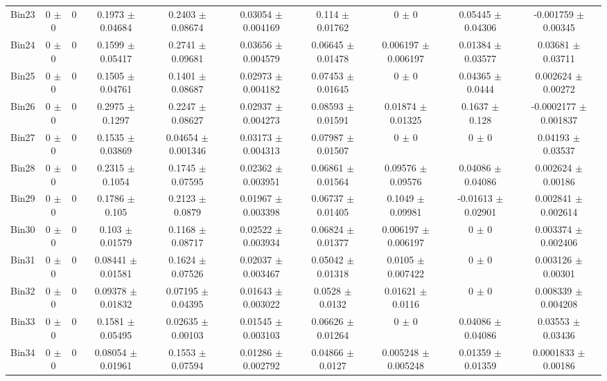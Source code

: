 \begin{tabular}{@{\extracolsep{4pt}}lccccccccc@{}}
     Bin23 & 0 $\pm$ 0 & 0 & 0.1973 $\pm$ 0.04684 & 0.2403 $\pm$ 0.08674 & 0.03054 $\pm$ 0.004169 & 0.114 $\pm$ 0.01762 & 0 $\pm$ 0 & 0.05445 $\pm$ 0.04306 & -0.001759 $\pm$ 0.00345 \\ 
     Bin24 & 0 $\pm$ 0 & 0 & 0.1599 $\pm$ 0.05417 & 0.2741 $\pm$ 0.09681 & 0.03656 $\pm$ 0.004579 & 0.06645 $\pm$ 0.01478 & 0.006197 $\pm$ 0.006197 & 0.01384 $\pm$ 0.03577 & 0.03681 $\pm$ 0.03711 \\ 
     Bin25 & 0 $\pm$ 0 & 0 & 0.1505 $\pm$ 0.04761 & 0.1401 $\pm$ 0.08687 & 0.02973 $\pm$ 0.004182 & 0.07453 $\pm$ 0.01645 & 0 $\pm$ 0 & 0.04365 $\pm$ 0.0444 & 0.002624 $\pm$ 0.00272 \\ 
     Bin26 & 0 $\pm$ 0 & 0 & 0.2975 $\pm$ 0.1297 & 0.2247 $\pm$ 0.08627 & 0.02937 $\pm$ 0.004273 & 0.08593 $\pm$ 0.01591 & 0.01874 $\pm$ 0.01325 & 0.1637 $\pm$ 0.128 & -0.0002177 $\pm$ 0.001837 \\ 
     Bin27 & 0 $\pm$ 0 & 0 & 0.1535 $\pm$ 0.03869 & 0.04654 $\pm$ 0.001346 & 0.03173 $\pm$ 0.004313 & 0.07987 $\pm$ 0.01507 & 0 $\pm$ 0 & 0 $\pm$ 0 & 0.04193 $\pm$ 0.03537 \\ 
     Bin28 & 0 $\pm$ 0 & 0 & 0.2315 $\pm$ 0.1054 & 0.1745 $\pm$ 0.07595 & 0.02362 $\pm$ 0.003951 & 0.06861 $\pm$ 0.01564 & 0.09576 $\pm$ 0.09576 & 0.04086 $\pm$ 0.04086 & 0.002624 $\pm$ 0.00186 \\ 
     Bin29 & 0 $\pm$ 0 & 0 & 0.1786 $\pm$ 0.105 & 0.2123 $\pm$ 0.0879 & 0.01967 $\pm$ 0.003398 & 0.06737 $\pm$ 0.01405 & 0.1049 $\pm$ 0.09981 & -0.01613 $\pm$ 0.02901 & 0.002841 $\pm$ 0.002614 \\ 
     Bin30 & 0 $\pm$ 0 & 0 & 0.103 $\pm$ 0.01579 & 0.1168 $\pm$ 0.08717 & 0.02522 $\pm$ 0.003934 & 0.06824 $\pm$ 0.01377 & 0.006197 $\pm$ 0.006197 & 0 $\pm$ 0 & 0.003374 $\pm$ 0.002406 \\ 
     Bin31 & 0 $\pm$ 0 & 0 & 0.08441 $\pm$ 0.01581 & 0.1624 $\pm$ 0.07526 & 0.02037 $\pm$ 0.003467 & 0.05042 $\pm$ 0.01318 & 0.0105 $\pm$ 0.007422 & 0 $\pm$ 0 & 0.003126 $\pm$ 0.00301 \\ 
     Bin32 & 0 $\pm$ 0 & 0 & 0.09378 $\pm$ 0.01832 & 0.07195 $\pm$ 0.04395 & 0.01643 $\pm$ 0.003022 & 0.0528 $\pm$ 0.0132 & 0.01621 $\pm$ 0.0116 & 0 $\pm$ 0 & 0.008339 $\pm$ 0.004208 \\ 
     Bin33 & 0 $\pm$ 0 & 0 & 0.1581 $\pm$ 0.05495 & 0.02635 $\pm$ 0.00103 & 0.01545 $\pm$ 0.003103 & 0.06626 $\pm$ 0.01264 & 0 $\pm$ 0 & 0.04086 $\pm$ 0.04086 & 0.03553 $\pm$ 0.03436 \\ 
     Bin34 & 0 $\pm$ 0 & 0 & 0.08054 $\pm$ 0.01961 & 0.1553 $\pm$ 0.07594 & 0.01286 $\pm$ 0.002792 & 0.04866 $\pm$ 0.0127 & 0.005248 $\pm$ 0.005248 & 0.01359 $\pm$ 0.01359 & 0.0001833 $\pm$ 0.00186 \\ 

\end{tabular}
